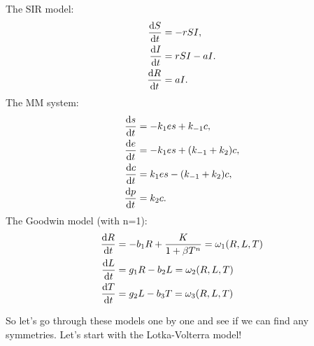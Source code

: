 The SIR model:
\begin{equation}
  \begin{split}
    \dv{S}{t}&=-rSI,\\
    \dv{I}{t}&=rSI-aI.\\
    \dv{R}{t}&=aI.\\    
    \end{split}
  \label{eq:SIR}
\end{equation}
The MM system:
\begin{equation}
  \begin{split}
    \dv{s}{t}&=-k_1 es+k_{-1}c,\\
    \dv{e}{t}&=-k_1 es+(k_{-1}+k_2)c,\\
    \dv{c}{t}&=k_1 es-(k_{-1}+k_2)c,\\
    \dv{p}{t}&=k_2 c.\\        
    \end{split}
  \label{eq:MM}
\end{equation}
The Goodwin model (with n=1):
\begin{equation}
\begin{split}
  \dv{R}{t}&=-b_1 R+\dfrac{K}{1+\beta T^n}=\omega_1 (R,L,T)\\
  \dv{L}{t}&=g_1 R- b_2 L=\omega_2 (R,L,T)\\
    \dv{T}{t}&=g_2 L-b_3 T=\omega_3 (R,L,T)
\end{split}
  \label{eq:Goodwin}
\end{equation}

So let's go through these models one by one and see if we can find any symmetries. Let's start with the Lotka-Volterra model!